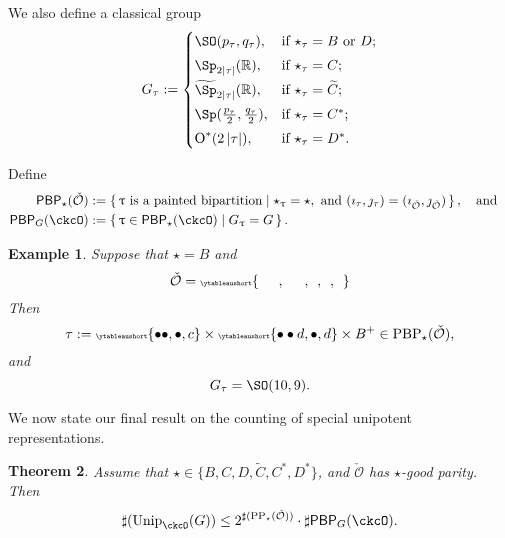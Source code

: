 \documentclass[12pt,a4paper]{amsart}
\let\ytb=\ytableaushort
\newcommand{\tytb}[1]{{\tiny\ytb{#1}}}
\def\abs#1{\left|{#1}\right|}
\newcommand{\CO}{{\mathcal {O}}}
\newcommand{\oO}{\operatorname{O}}
\newcommand{\R}{\mathbb R}
\numberwithin{equation}{section}
\newtheorem{thm}{Theorem}[section]
\newtheorem{eg}[thm]{Example}
\theoremstyle{remark}
\def\Unip{\mathrm{Unip}}
\def\AND{\quad \text{and} \quad}
\def\CPP{\mathrm{PP}}
\def\PBP{\mathsf{PBP}}
\begin{document}
We also define a classical group
\begin{equation}\label{def:Gt}
  G_\tau:=
  \begin{cases}
    \SO(p_\tau, q_\tau), &\hbox{if $\star_\tau=B$ or $D$}; \smallskip\\
    \Sp_{2\abs{\tau}}(\R), &\hbox{if $\star_\tau=C$}; \smallskip\\
    \widetilde{\Sp}_{2\abs{\tau}}(\R), &\hbox{if $\star_\tau=\widetilde{ C}$}; \smallskip \\
    \Sp(\frac{p_\tau}{2}, \frac{q_\tau}{2}), &\hbox{if $\star_\tau=C^*$}; \smallskip \\
    \oO^*(2\abs{\tau}), &\hbox{if $\star_\tau=D^*$}.\\
  \end{cases}
\end{equation}

Define
\[
  \begin{split}
    \PBP_\star(\check \CO) &:=\set{ \uptau\textrm{ is a painted
        bipartition} \mid \star_\uptau = \star, \text{ and
      } (\imath_\tau,\jmath_\tau) = (\imath_{\check \CO}, \jmath_{\check \CO})}, \AND\\
    \PBP_{G}(\ckcO) &:=\set{\uptau\in \PBP_{\star}(\ckcO)| G_{\uptau} = G}.
  \end{split}
\]


\delete{
  \[
    \begin{array}{rl}
      \mathrm{PBP}_\star(\check \CO):=\{ &
                                           \tau\textrm{ is a painted bipartition}  \mid    \star_\tau = \star,
                                           \text{ and } \\  & (\imath_\tau,\jmath_\tau) = (\imath_{\check \CO}, \jmath_{\check \CO})\}.
    \end{array}
  \]
}




\begin{eg} Suppose that $\star=B$ and
  \[
    \check \CO =\tytb{\ \ \ \ \ \ , \ \ \ \ \ \ , \ \ , \ \ , \ \ }
  \]
  Then
  \[
    \tau:= \tytb{\bullet \bullet ,\bullet , c } \times \tytb{\bullet \bullet d ,\bullet , d }\times B^+\in \mathrm{PBP}_{\star}(\check \CO),
  \]
  and
  \[
    G_\tau=\SO(10,9).
  \]
\end{eg}


We now state our final result on the counting of special unipotent representations.

\begin{thm}\label{countup}
  Assume that $\star\in \{B, C,D,\widetilde {C}, C^*, D^*\}$, and $\check \CO$ has $\star$-good parity. Then
  \[
    \sharp(\Unip_{\ckcO}(G))\leq 2^{\sharp(\CPP_\star(\check \CO))} \cdot \sharp \PBP_{G}(\ckcO).
  \]
\end{thm}
\end{document}
